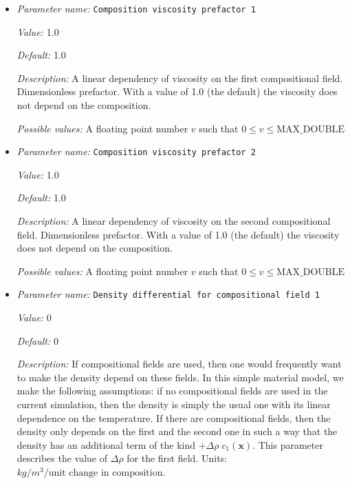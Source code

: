 \begin{itemize}
\item {\it Parameter name:} {\tt Composition viscosity prefactor 1}
\label{parameters:Material model/Composition reaction model/Composition viscosity prefactor 1}


{\it Value:} 1.0


{\it Default:} 1.0


{\it Description:} A linear dependency of viscosity on the first compositional field. Dimensionless prefactor. With a value of 1.0 (the default) the viscosity does not depend on the composition.


{\it Possible values:} A floating point number $v$ such that $0 \leq v \leq \text{MAX\_DOUBLE}$
\item {\it Parameter name:} {\tt Composition viscosity prefactor 2}
\label{parameters:Material model/Composition reaction model/Composition viscosity prefactor 2}


{\it Value:} 1.0


{\it Default:} 1.0


{\it Description:} A linear dependency of viscosity on the second compositional field. Dimensionless prefactor. With a value of 1.0 (the default) the viscosity does not depend on the composition.


{\it Possible values:} A floating point number $v$ such that $0 \leq v \leq \text{MAX\_DOUBLE}$
\item {\it Parameter name:} {\tt Density differential for compositional field 1}
\label{parameters:Material model/Composition reaction model/Density differential for compositional field 1}


{\it Value:} 0


{\it Default:} 0


{\it Description:} If compositional fields are used, then one would frequently want to make the density depend on these fields. In this simple material model, we make the following assumptions: if no compositional fields are used in the current simulation, then the density is simply the usual one with its linear dependence on the temperature. If there are compositional fields, then the density only depends on the first and the second one in such a way that the density has an additional term of the kind $+\Delta \rho \; c_1(\mathbf x)$. This parameter describes the value of $\Delta \rho$ for the first field. Units: $kg/m^3/\textrm{unit change in composition}$.



\end{itemize}
